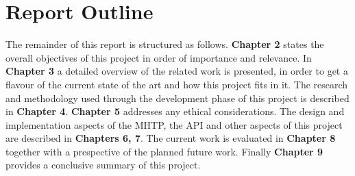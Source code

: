\section{Report Outline}
The remainder of this report is structured as follows. \textbf{Chapter 2} states the overall objectives of this project in order of importance and relevance. In \textbf{Chapter 3} a detailed overview of the related work is presented, in order to get a flavour of the current state of the art and how this project fits in it. The research and methodology used through the development phase of this project is described in \textbf{Chapter 4}. \textbf{Chapter 5} addresses any ethical considerations. The design and implementation aspects of the MHTP, the API and other aspects of this project are described in \textbf{Chapters 6, 7}. The current work is evaluated in \textbf{Chapter 8} together with a prespective of the planned future work. Finally \textbf{Chapter 9} provides a conclusive summary of this project.